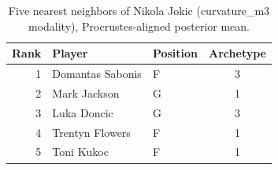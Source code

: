 \begin{table}[htbp]
  \centering\small
  \begin{tabular}{rllc}
    \toprule
    Rank & Player & Position & Archetype \\
    \midrule
    1 & Domantas Sabonis & F & 3 \\
    2 & Mark Jackson & G & 1 \\
    3 & Luka Doncic & G & 3 \\
    4 & Trentyn Flowers & F & 1 \\
    5 & Toni Kukoc & F & 1 \\
    \bottomrule
  \end{tabular}
  \caption{Five nearest neighbors of Nikola Jokic (curvature_m3 modality), Procrustes-aligned posterior mean.}
  \label{tab:Nikola_Jokic_neighbors_curvature_m3}
\end{table}

